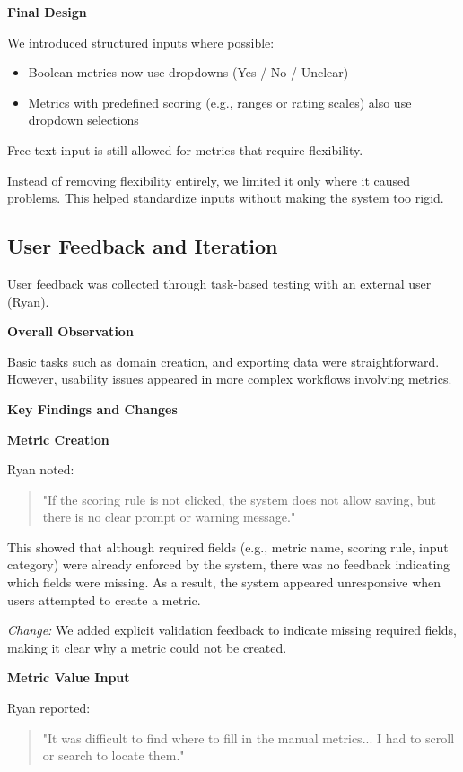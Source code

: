 \documentclass{article}
\begin{document}
\textbf{Final Design}

We introduced structured inputs where possible:

\begin{itemize}
    \item Boolean metrics now use dropdowns (Yes / No / Unclear)
    \item Metrics with predefined scoring (e.g., ranges or rating scales) also use dropdown selections
\end{itemize}

Free-text input is still allowed for metrics that require flexibility.

Instead of removing flexibility entirely, we limited it only where it caused problems. This helped standardize inputs without making the system too rigid.

\subsection{User Feedback and Iteration}

User feedback was collected through task-based testing with an external user (Ryan).

\textbf{Overall Observation}

Basic tasks such as domain creation, and exporting data were straightforward. However, usability issues appeared in more complex workflows involving metrics.

\textbf{Key Findings and Changes}

\textbf{Metric Creation}

Ryan noted:
\begin{quote}
"If the scoring rule is not clicked, the system does not allow saving, but there is no clear prompt or warning message."
\end{quote}

This showed that although required fields (e.g., metric name, scoring rule, input category) were already enforced by the system, there was no feedback indicating which fields were missing. As a result, the system appeared unresponsive when users attempted to create a metric.

\textit{Change:}
We added explicit validation feedback to indicate missing required fields, making it clear why a metric could not be created.

\vspace{0.2cm}

\textbf{Metric Value Input}

Ryan reported:
\begin{quote}
"It was difficult to find where to fill in the manual metrics... I had to scroll or search to locate them."
\end{quote}
\end{document}
